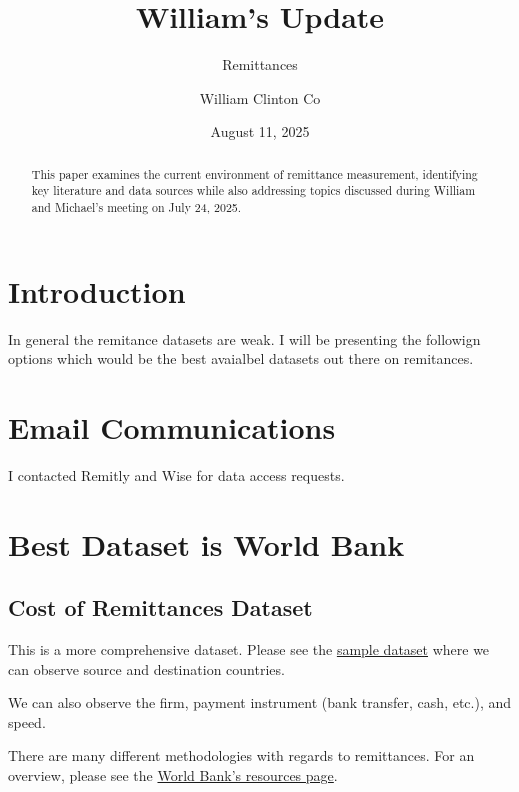 \documentclass[
  11pt,
]{article}
\title{William's Update}
\subtitle{Remittances}
\author{William Clinton Co}
\date{August 11, 2025}
\renewcommand*\contentsname{Table of contents}
\newcommand\contentsname{Table of contents}
\begin{document}
\maketitle
\begin{abstract}
This paper examines the current environment of remittance measurement,
identifying key literature and data sources while also addressing topics
discussed during William and Michael's meeting on July 24, 2025.
\end{abstract}

\renewcommand*\contentsname{Table of contents}
{
\hypersetup{linkcolor=}
\setcounter{tocdepth}{3}
\tableofcontents
}

\section{Introduction}\label{introduction}

In general the remitance datasets are weak. I will be presenting the
followign options which would be the best avaialbel datasets out there
on remitances.

\section{Email Communications}\label{email-communications}

I contacted Remitly and Wise for data access requests.

\section{Best Dataset is World Bank}\label{best-dataset-is-world-bank}

\subsection{Cost of Remittances
Dataset}\label{cost-of-remittances-dataset}

This is a more comprehensive dataset. Please see the
\href{https://github.com/WilliamClintC/RER/blob/main/data/Remittance_2/rpw_dataset_2011_2024_q3.xlsx}{sample
dataset} where we can observe source and destination countries.

We can also observe the firm, payment instrument (bank transfer, cash,
etc.), and speed.

There are many different methodologies with regards to remittances. For
an overview, please see the
\href{https://remittanceprices.worldbank.org/resources}{World Bank's
resources page}.
\end{document}
